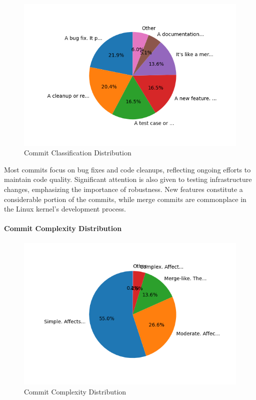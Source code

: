 \begin{figure}[ht]
    \centering
    \includegraphics[width=\linewidth]{feature-analysis/commit_pie_chart_commit_classification.png}
    \caption{Commit Classification Distribution}
    \label{fig:commit_pie_chart_commit_classification}
\end{figure}

Most commits focus on bug fixes and code cleanups, reflecting ongoing efforts to maintain code quality. Significant attention is also given to testing infrastructure changes, emphasizing the importance of robustness. New features constitute a considerable portion of the commits, while merge commits are commonplace in the Linux kernel's development process.

\paragraph{Commit Complexity Distribution}

\begin{figure}[ht]
    \centering
    \includegraphics[width=\linewidth]{feature-analysis/commit_pie_chart_commit_complexity.png}
    \caption{Commit Complexity Distribution}
    \label{fig:commit_pie_chart_commit_complexity}
\end{figure}

